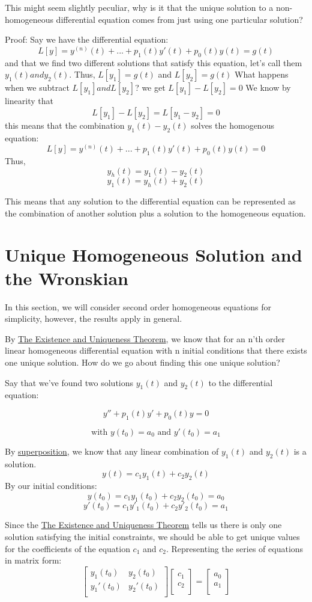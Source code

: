 \documentclass{report}
\begin{document}
This might seem slightly peculiar, why is it that the unique solution to a non-homogeneous differential equation comes from just using one particular solution?

Proof:
Say we have the differential equation:
 $$L[y] = y^{(n)}(t) + ... + p_1(t)y'(t) + p_0(t)y(t) = g(t)$$
and that we find two different solutions that satisfy this equation, let's call them $y_1(t) and y_2(t)$.
Thus, $L[y_1]=g(t)$ and $L[y_2]=g(t)$
What happens when we subtract $L[y_1] and L[y_2]$?
we get $L[y_1]-L[y_2] = 0$
We know by linearity that 
$$L[y_1]-L[y_2] = L[y_1-y_2] = 0$$
this means that the combination $y_1(t)-y_2(t)$ solves the homogenous equation:
$$L[y] = y^{(n)}(t) + ... + p_1(t)y'(t) + p_0(t)y(t) = 0$$
Thus,
$$y_h(t) = y_1(t)-y_2(t)$$
$$y_1(t) = y_h(t) + y_2(t)$$

This means that any solution to the differential equation can be represented as the combination of another solution plus a solution to the homogeneous equation. 

\section{Unique Homogeneous Solution and the Wronskian}
In this section, we will consider second order homogeneous equations for simplicity, however, the results apply in general.

By \hyperref[th:Ex&Un]{The Existence and Uniqueness Theorem}, we know that for an n'th order linear homogeneous differential equation with n initial conditions that there exists one unique solution. How do we go about finding this one unique solution?

Say that we've found two solutions $y_1(t)$ and $y_2(t)$ to the differential equation:

$$y'' + p_1(t)y' + p_0(t)y = 0$$

$$\text{with } y(t_0) = a_0 \text{ and } y'(t_0) = a_1$$

By \hyperref[th:super]{superposition}, we know that any linear combination of $y_1(t)$ and $y_2(t)$ is a solution.
$$y(t) = c_1y_1(t) + c_2y_2(t)$$
By our initial conditions:
$$y(t_0) = c_1y_1(t_0) + c_2y_2(t_0) = a_0$$
$$y'(t_0) = c_1y'_1(t_0) + c_2y'_2(t_0) = a_1$$

Since the \hyperref[th:Ex&Un]{The Existence and Uniqueness Theorem} tells us there is only one solution satisfying the initial constraints, we should be able to get unique values for the coefficients of the equation $c_1$ and $c_2$. Representing the series of equations in matrix form:
$$
\begin{bmatrix}
    y_1(t_0) & y_2(t_0) \\
    y_1'(t_0) & y_2'(t_0) \\
\end{bmatrix}
\begin{bmatrix}
    c_1 \\
    c_2 \\
\end{bmatrix}
=
\begin{bmatrix}
    a_0 \\
    a_1 \\
\end{bmatrix}
$$
\end{document}
